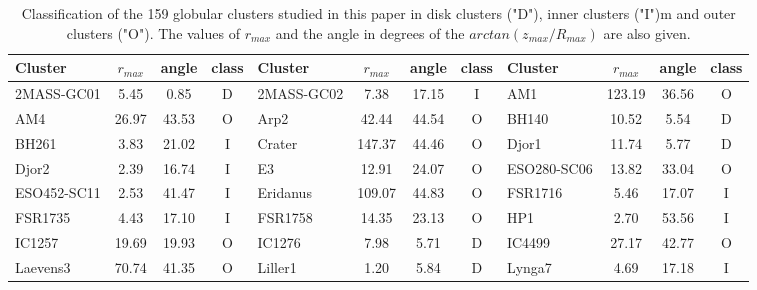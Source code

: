         \tiny
        \begin{table}
            \caption[Classification of the 159 globular clusters studied in this chapter as Disk, Inner, or Outer clusters]{Classification of the 159 globular clusters studied in this paper in disk clusters ("D"), inner clusters ("I")m and outer clusters ("O"). The values of $r_{max}$ and the angle in degrees of the $arctan(z_{max}/R_{max})$ are also given.}\label{classification}
            \small
            \begin{tabular}{l | c | c | c | l | c | c | c | l | c | c | c}
            \hline
                Cluster &    $r_{max}$ &  angle & class & Cluster &    $r_{max}$ &  angle & class & Cluster &    $r_{max}$ &  angle & class \\
                        \hline \hline
            2MASS-GC01 &   5.45 &   0.85 &              D &
            2MASS-GC02 &   7.38 &  17.15 &              I &
                    AM1 & 123.19 &  36.56 &              O \\
                    AM4 &  26.97 &  43.53 &              O &
                    Arp2 &  42.44 &  44.54 &              O &
                    BH140 &  10.52 &   5.54 &              D \\
                    BH261 &   3.83 &  21.02 &              I &
                Crater & 147.37 &  44.46 &              O &
                    Djor1 &  11.74 &   5.77 &              D \\
                    Djor2 &   2.39 &  16.74 &              I &
                    E3 &  12.91 &  24.07 &              O &
            ESO280-SC06 &  13.82 &  33.04 &              O \\
            ESO452-SC11 &   2.53 &  41.47 &              I &
                Eridanus & 109.07 &  44.83 &              O &
                FSR1716 &   5.46 &  17.07 &              I \\
                FSR1735 &   4.43 &  17.10 &              I &
                FSR1758 &  14.35 &  23.13 &              O &
                    HP1 &   2.70 &  53.56 &              I \\
                IC1257 &  19.69 &  19.93 &              O &
                IC1276 &   7.98 &   5.71 &              D &
                IC4499 &  27.17 &  42.77 &              O \\
                Laevens3 &  70.74 &  41.35 &              O &
                Liller1 &   1.20 &   5.84 &              D &
                Lynga7 &   4.69 &  17.18 &              I \\

\end{tabular}
\end{table}
